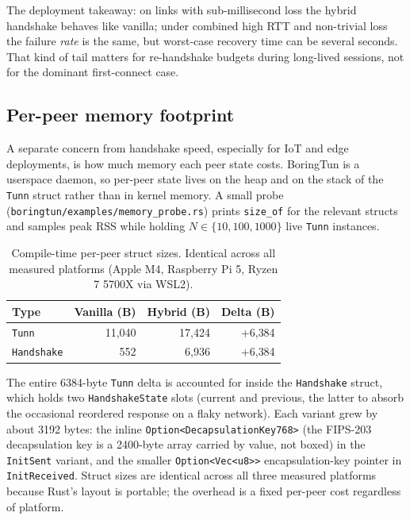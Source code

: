 \documentclass[11pt,a4paper]{article}
\begin{document}
The deployment takeaway: on links with sub-millisecond loss the hybrid handshake behaves like vanilla; under combined high RTT and non-trivial loss the failure \emph{rate} is the same, but worst-case recovery time can be several seconds. That kind of tail matters for re-handshake budgets during long-lived sessions, not for the dominant first-connect case.

\subsection{Per-peer memory footprint}
\label{sec:eval_memory}

A separate concern from handshake speed, especially for IoT and edge deployments, is how much memory each peer state costs. BoringTun is a userspace daemon, so per-peer state lives on the heap and on the stack of the \texttt{Tunn} struct rather than in kernel memory. A small probe (\texttt{boringtun/examples/memory\_probe.rs}) prints \texttt{size\_of} for the relevant structs and samples peak RSS while holding $N \in \{10, 100, 1000\}$ live \texttt{Tunn} instances.

\begin{table}[H]
\centering
\caption{Compile-time per-peer struct sizes. Identical across all measured platforms (Apple M4, Raspberry Pi 5, Ryzen 7 5700X via WSL2).}
\label{tab:struct_sizes}
\begin{tabular}{@{}lrrr@{}}
\toprule
\textbf{Type} & \textbf{Vanilla (B)} & \textbf{Hybrid (B)} & \textbf{Delta (B)} \\
\midrule
\texttt{Tunn}      & 11{,}040 & 17{,}424 & +6{,}384 \\
\texttt{Handshake} &    552   &  6{,}936 & +6{,}384 \\
\bottomrule
\end{tabular}
\end{table}

The entire 6384-byte \texttt{Tunn} delta is accounted for inside the \texttt{Handshake} struct, which holds two \texttt{HandshakeState} slots (current and previous, the latter to absorb the occasional reordered response on a flaky network). Each variant grew by about 3192 bytes: the inline \texttt{Option<DecapsulationKey768>} (the FIPS-203 decapsulation key is a 2400-byte array carried by value, not boxed) in the \texttt{InitSent} variant, and the smaller \texttt{Option<Vec<u8>>} encapsulation-key pointer in \texttt{InitReceived}. Struct sizes are identical across all three measured platforms because Rust's layout is portable; the overhead is a fixed per-peer cost regardless of platform.
\end{document}
